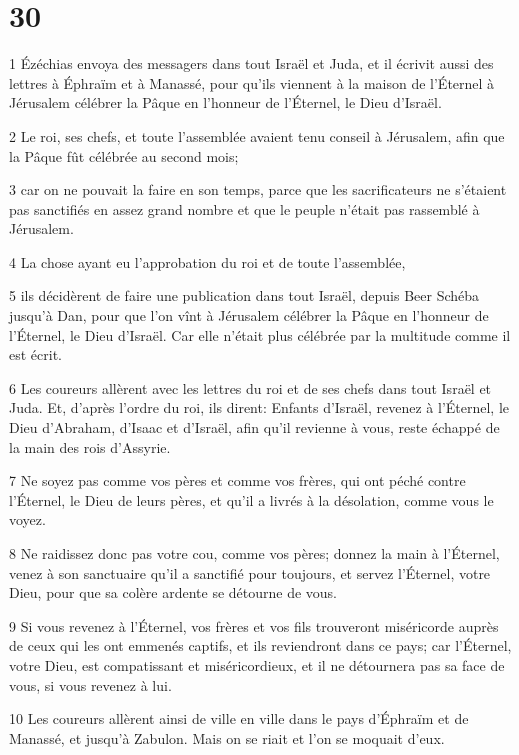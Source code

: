 \chapter{30}

\par 1 Ézéchias envoya des messagers dans tout Israël et Juda, et il écrivit aussi des lettres à Éphraïm et à Manassé, pour qu'ils viennent à la maison de l'Éternel à Jérusalem célébrer la Pâque en l'honneur de l'Éternel, le Dieu d'Israël.
\par 2 Le roi, ses chefs, et toute l'assemblée avaient tenu conseil à Jérusalem, afin que la Pâque fût célébrée au second mois;
\par 3 car on ne pouvait la faire en son temps, parce que les sacrificateurs ne s'étaient pas sanctifiés en assez grand nombre et que le peuple n'était pas rassemblé à Jérusalem.
\par 4 La chose ayant eu l'approbation du roi et de toute l'assemblée,
\par 5 ils décidèrent de faire une publication dans tout Israël, depuis Beer Schéba jusqu'à Dan, pour que l'on vînt à Jérusalem célébrer la Pâque en l'honneur de l'Éternel, le Dieu d'Israël. Car elle n'était plus célébrée par la multitude comme il est écrit.
\par 6 Les coureurs allèrent avec les lettres du roi et de ses chefs dans tout Israël et Juda. Et, d'après l'ordre du roi, ils dirent: Enfants d'Israël, revenez à l'Éternel, le Dieu d'Abraham, d'Isaac et d'Israël, afin qu'il revienne à vous, reste échappé de la main des rois d'Assyrie.
\par 7 Ne soyez pas comme vos pères et comme vos frères, qui ont péché contre l'Éternel, le Dieu de leurs pères, et qu'il a livrés à la désolation, comme vous le voyez.
\par 8 Ne raidissez donc pas votre cou, comme vos pères; donnez la main à l'Éternel, venez à son sanctuaire qu'il a sanctifié pour toujours, et servez l'Éternel, votre Dieu, pour que sa colère ardente se détourne de vous.
\par 9 Si vous revenez à l'Éternel, vos frères et vos fils trouveront miséricorde auprès de ceux qui les ont emmenés captifs, et ils reviendront dans ce pays; car l'Éternel, votre Dieu, est compatissant et miséricordieux, et il ne détournera pas sa face de vous, si vous revenez à lui.
\par 10 Les coureurs allèrent ainsi de ville en ville dans le pays d'Éphraïm et de Manassé, et jusqu'à Zabulon. Mais on se riait et l'on se moquait d'eux.

